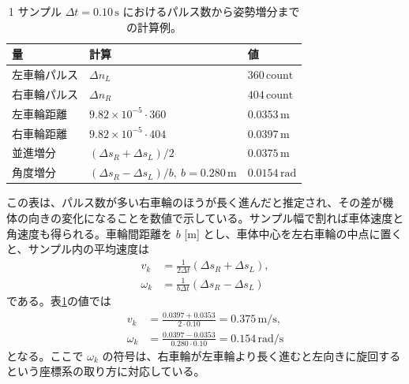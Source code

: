 \begin{table}[tb]
  \centering
  \caption{1 サンプル $\Delta t=0.10\,\mathrm{s}$ におけるパルス数から姿勢増分までの計算例。}
  \label{tab:flow-six-encoder-step}
  \begin{tabular}{lll}
    \hline
    量 & 計算 & 値 \\
    \hline
    左車輪パルス & $\Delta n_L$ & $360\,\mathrm{count}$ \\
    右車輪パルス & $\Delta n_R$ & $404\,\mathrm{count}$ \\
    左車輪距離 & $9.82\times10^{-5}\cdot360$ & $0.0353\,\mathrm{m}$ \\
    右車輪距離 & $9.82\times10^{-5}\cdot404$ & $0.0397\,\mathrm{m}$ \\
    並進増分 & $(\Delta s_R+\Delta s_L)/2$ & $0.0375\,\mathrm{m}$ \\
    角度増分 & $(\Delta s_R-\Delta s_L)/b,\ b=0.280\,\mathrm{m}$ & $0.0154\,\mathrm{rad}$ \\
    \hline
  \end{tabular}
\end{table}

この表は、パルス数が多い右車輪のほうが長く進んだと推定され、その差が機体の向きの変化になることを数値で示している。サンプル幅で割れば車体速度と角速度も得られる。車輪間距離を $b$ [m] とし、車体中心を左右車輪の中点に置くと、サンプル内の平均速度は
\begin{align}
  v_k&=\frac{1}{2\Delta t}(\Delta s_R+\Delta s_L),\\
  \omega_k&=\frac{1}{b\Delta t}(\Delta s_R-\Delta s_L)
  \label{eq:diff-drive-kinematics}
\end{align}
である。表\ref{tab:flow-six-encoder-step}の値では
\begin{align}
  v_k&=\frac{0.0397+0.0353}{2\cdot0.10}
       =0.375\,\mathrm{m/s},\\
  \omega_k&=\frac{0.0397-0.0353}{0.280\cdot0.10}
       =0.154\,\mathrm{rad/s}
\end{align}
となる。ここで $\omega_k$ の符号は、右車輪が左車輪より長く進むと左向きに旋回するという座標系の取り方に対応している。

